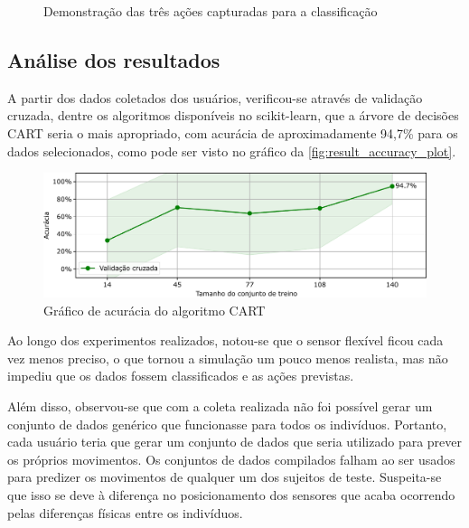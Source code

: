 \begin{figure}[ht]
	\caption{\label{fig:result_estados}Demonstração das três ações capturadas para a classificação}
	\begin{center}
	\end{center}
\end{figure}

\subsection{Análise dos resultados}\label{sec:result_analise}

A partir dos dados coletados dos usuários, verificou-se através de validação cruzada, dentre os algoritmos disponíveis no scikit-learn, que a árvore de decisões CART seria o mais apropriado, com acurácia de aproximadamente 94,7\% para os dados selecionados, como pode ser visto no gráfico da \autoref{fig:result_accuracy_plot}.

\begin{figure}[ht]
	\caption{\label{fig:result_accuracy_plot}Gráfico de acurácia do algoritmo CART}
	\begin{center}
	    \includegraphics[width=\textwidth]{resources/result_accuracy_plot}
	\end{center}
\end{figure}

Ao longo dos experimentos realizados, notou-se que o sensor flexível ficou cada vez menos preciso, o que tornou a simulação um pouco menos realista, mas não impediu que os dados fossem classificados e as ações previstas.

Além disso, observou-se que com a coleta realizada não foi possível gerar um conjunto de dados genérico que funcionasse para todos os indivíduos. Portanto, cada usuário teria que gerar um conjunto de dados que seria utilizado para prever os próprios movimentos. Os conjuntos de dados compilados falham ao ser usados para predizer os movimentos de qualquer um dos sujeitos de teste. Suspeita-se que isso se deve à diferença no posicionamento dos sensores que acaba ocorrendo pelas diferenças físicas entre os indivíduos.